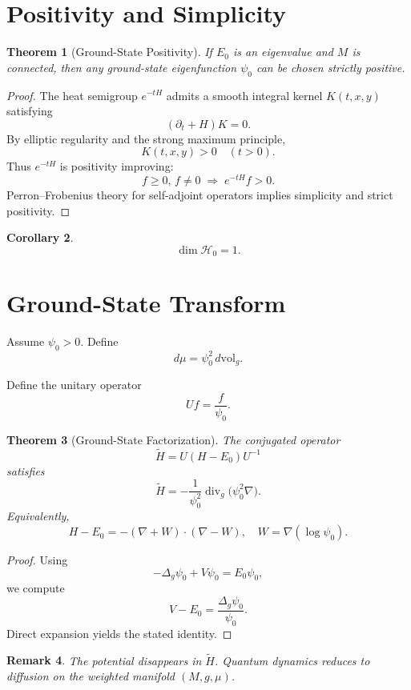 \documentclass[11pt]{article}
\newtheorem{theorem}{Theorem}[section]
\newtheorem{corollary}[theorem]{Corollary}
\newtheorem{remark}[theorem]{Remark}
\begin{document}
\section{Positivity and Simplicity}

\begin{theorem}[Ground-State Positivity]
If $E_0$ is an eigenvalue and $M$ is connected, then any ground-state eigenfunction 
$\psi_0$ can be chosen strictly positive.
\end{theorem}

\begin{proof}
The heat semigroup $e^{-tH}$ admits a smooth integral kernel $K(t,x,y)$ satisfying
\[
(\partial_t + H)K = 0.
\]
By elliptic regularity and the strong maximum principle,
\[
K(t,x,y) > 0 \quad (t>0).
\]
Thus $e^{-tH}$ is positivity improving:
\[
f \ge 0,\, f \neq 0 \;\Rightarrow\; e^{-tH}f > 0.
\]
Perron--Frobenius theory for self-adjoint operators implies simplicity and strict positivity.
\end{proof}

\begin{corollary}
\[
\dim \mathcal H_0 = 1.
\]
\end{corollary}

\section{Ground-State Transform}

Assume $\psi_0>0$. Define
\[
d\mu = \psi_0^2 \, d\mathrm{vol}_g.
\]

Define the unitary operator
\[
U f = \frac{f}{\psi_0}.
\]

\begin{theorem}[Ground-State Factorization]
The conjugated operator
\[
\widetilde H = U(H-E_0)U^{-1}
\]
satisfies
\[
\widetilde H
=
-\frac{1}{\psi_0^2}
\operatorname{div}_g
\big(
\psi_0^2 \nabla
\big).
\]
Equivalently,
\[
H - E_0
=
-(\nabla + W)\cdot(\nabla - W),
\quad
W = \nabla(\log \psi_0).
\]
\end{theorem}

\begin{proof}
Using
\[
-\Delta_g \psi_0 + V\psi_0 = E_0 \psi_0,
\]
we compute
\[
V - E_0 = \frac{\Delta_g \psi_0}{\psi_0}.
\]
Direct expansion yields the stated identity.
\end{proof}

\begin{remark}
The potential disappears in $\widetilde H$. 
Quantum dynamics reduces to diffusion on the weighted manifold $(M,g,\mu)$.
\end{remark}
\end{document}
